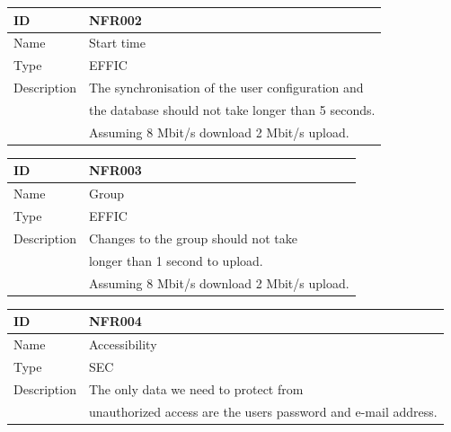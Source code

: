 \documentclass[12pt]{article}
\theoremstyle{definition}
\begin{document}
\vspace*{1 cm}

\begin{flushleft}
  \begin{tabular}{|l|L{10cm}|}
  \hline
  ID &  NFR002\\ \hline
  Name & Start time \\ \hline
  Type &  EFFIC\\ \hline
  Description & The synchronisation of the user configuration and \\
  & the database should not take longer than 5 seconds. \\ 
  & Assuming 8 Mbit/s download 2 Mbit/s upload. \\ \hline
  \end{tabular}
\end{flushleft}

\vspace*{1 cm}

\begin{flushleft}
  \begin{tabular}{|l|L{10cm}|}
  \hline
  ID &  NFR003\\ \hline
  Name & Group \\ \hline
  Type &  EFFIC\\ \hline
  Description & Changes to the group should not take \\
  & longer than 1 second to upload. \\ 
  & Assuming 8 Mbit/s download 2 Mbit/s upload. \\ \hline
  \end{tabular}
\end{flushleft}

\vspace*{1 cm}

\begin{flushleft}
  \begin{tabular}{|l|L{10cm}|}
  \hline
  ID &  NFR004\\ \hline
  Name & Accessibility \\ \hline
  Type &  SEC \\ \hline
  Description & The only data we need to protect from \\
  & unauthorized access are the users password and e-mail address. \\ \hline
  \end{tabular}
\end{flushleft}

\pagebreak
\end{document}
